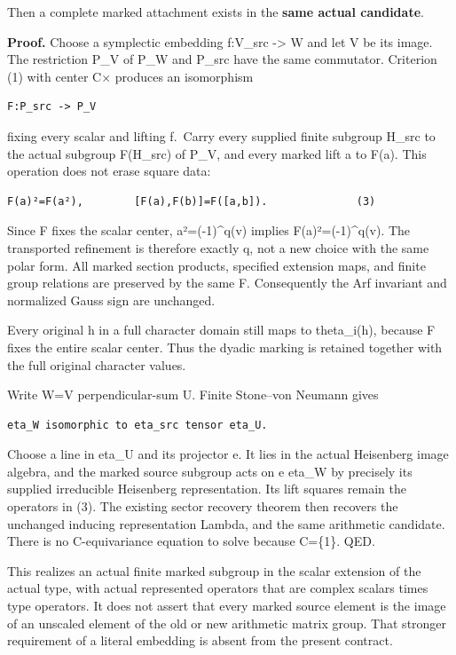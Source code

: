 Then a complete marked attachment exists in the \textbf{same actual
candidate}.

\textbf{Proof.} Choose a symplectic embedding f:V\_src -\textgreater{} W
and let V be its image. The restriction P\_V of P\_W and P\_src have the
same commutator. Criterion (1) with center C× produces an isomorphism

\begin{Verbatim}[fontsize=\small,breaklines=true,breakanywhere=true]
F:P_src -> P_V
\end{Verbatim}

fixing every scalar and lifting f.~Carry every supplied finite subgroup
H\_src to the actual subgroup F(H\_src) of P\_V, and every marked lift a
to F(a). This operation does not erase square data:

\begin{Verbatim}[fontsize=\small,breaklines=true,breakanywhere=true]
F(a)²=F(a²),        [F(a),F(b)]=F([a,b]).              (3)
\end{Verbatim}

Since F fixes the scalar center, a²=(-1)\^{}q(v) implies
F(a)²=(-1)\^{}q(v). The transported refinement is therefore exactly q,
not a new choice with the same polar form. All marked section products,
specified extension maps, and finite group relations are preserved by
the same F. Consequently the Arf invariant and normalized Gauss sign are
unchanged.

Every original h in a full character domain still maps to theta\_i(h),
because F fixes the entire scalar center. Thus the dyadic marking is
retained together with the full original character values.

Write W=V perpendicular-sum U. Finite Stone--von Neumann gives

\begin{Verbatim}[fontsize=\small,breaklines=true,breakanywhere=true]
eta_W isomorphic to eta_src tensor eta_U.
\end{Verbatim}

Choose a line in eta\_U and its projector e. It lies in the actual
Heisenberg image algebra, and the marked source subgroup acts on e
eta\_W by precisely its supplied irreducible Heisenberg representation.
Its lift squares remain the operators in (3). The existing sector
recovery theorem then recovers the unchanged inducing representation
Lambda, and the same arithmetic candidate. There is no C-equivariance
equation to solve because C=\{1\}. QED.

This realizes an actual finite marked subgroup in the scalar extension
of the actual type, with actual represented operators that are complex
scalars times type operators. It does not assert that every marked
source element is the image of an unscaled element of the old or new
arithmetic matrix group. That stronger requirement of a literal embedding is absent from the present contract.


